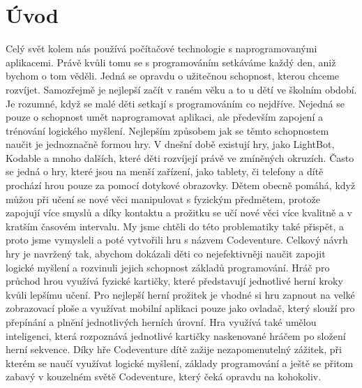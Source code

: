 \chapter{Úvod}

Celý svět kolem nás používá počítačové technologie s naprogramovanými aplikacemi. Právě kvůli tomu se s programováním setkáváme každý den, aniž bychom o tom věděli. Jedná se opravdu o užitečnou schopnost, kterou chceme rozvíjet. Samozřejmě je nejlepší začít v raném věku a to u dětí ve školním období. Je rozumné, když se malé děti setkají s programováním co nejdříve. Nejedná se pouze o schopnost umět naprogramovat aplikaci, ale především zapojení a trénování logického myšlení. Nejlepším způsobem jak se těmto schopnostem naučit je jednoznačně formou hry. V dnešní době existují hry, jako LightBot, Kodable a mnoho dalších, které děti rozvíjejí právě ve zmíněných okruzích. Často se jedná o hry, které jsou na menší zařízení, jako tablety, či telefony a dítě prochází hrou pouze za pomocí dotykové obrazovky. Dětem obecně pomáhá, když můžou při učení se nové věci manipulovat s fyzickým předmětem, protože zapojují více smyslů a díky kontaktu a prožitku se učí nové věci více kvalitně a v kratším časovém intervalu. My jsme chtěli do této problematiky také přispět, a proto jsme vymysleli a poté vytvořili hru s názvem Codeventure. Celkový návrh hry je navržený tak, abychom dokázali děti co nejefektivněji naučit zapojit logické myšlení a rozvinuli jejich schopnost základů programování. Hráč pro průchod hrou využívá fyzické kartičky, které představují jednotlivé herní kroky kvůli lepšímu učení. Pro nejlepší herní prožitek je vhodné si hru zapnout na velké zobrazovací ploše a využívat mobilní aplikaci pouze jako ovladač, který slouží pro přepínání a plnění jednotlivých herních úrovní. Hra využívá také umělou inteligenci, která rozpoznává jednotlivé kartičky naskenované hráčem po složení herní sekvence. Díky hře Codeventure dítě zažije nezapomenutelný zážitek, při kterém se naučí využívat logické myšlení, základy programování a ještě se přitom zabavý v kouzelném světě Codeventure, který čeká opravdu na kohokoliv.
